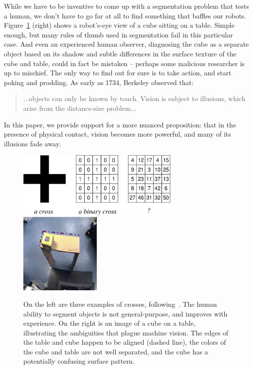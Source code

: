While we have to be inventive to come up with a segmentation problem
that tests a human, we don't have to go far at all to find something
that baffles our robots.  Figure~\ref{fig:number-cross} (right) shows a
robot's-eye view of a cube sitting on a table.  Simple enough, but
many rules of thumb used in segmentation fail in this particular case.
And even an experienced human observer, diagnosing the cube as a
separate object based on its shadow and subtle differences in the
surface texture of the cube and table, could in fact be mistaken --
perhaps some malicious researcher is up to mischief.  The only way to
find out for sure is to take action, and start poking and prodding.
As early as 1734, Berkeley observed that:
%
\begin{quote}
...objects can only be known by
touch. Vision is subject to illusions, which arise from the
distance-size problem... \cite{berkeley72new}
\end{quote}
%
In this paper, we provide support for a more nuanced proposition: that
in the presence of physical contact, vision becomes more powerful, and many of
its illusions fade away.


%
\begin{figure}[tb]
\begin{center}
\includegraphics[width=8.0cm]{number-cross.eps}
\hspace{2cm}
\includegraphics[width=4cm]{setup-sequence.eps}
\caption{ 
\label{fig:number-cross}
%
On the left are three examples of crosses,
following~\cite{manzotti01coscienza}.  The human ability to segment
objects is not general-purpose, and improves with experience.
On the right is an image of a cube on a table, illustrating the
ambiguities that plague machine vision. 
The edges of the table and cube happen to be
aligned (dashed line), the colors of the cube and table are not well
separated, and the cube has a potentially confusing surface pattern.
%
}
\end{center}
\end{figure}
%
%




